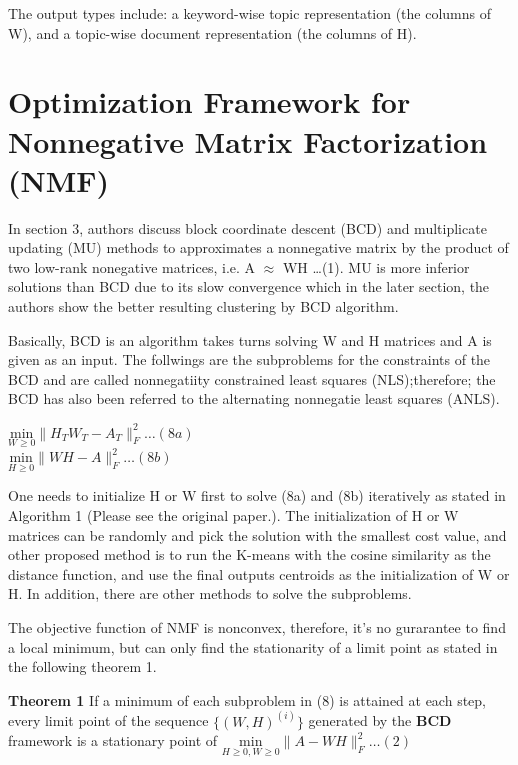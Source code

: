 \documentclass[11pt, oneside]{article}   	%
\begin{document}
The output types include: a keyword-wise topic representation (the columns of W), and a topic-wise document representation (the columns of H). 

\section{Optimization Framework for Nonnegative Matrix Factorization (NMF)}
In section 3, authors discuss block coordinate descent (BCD) and multiplicate updating (MU) methods to approximates a nonnegative matrix by the product of two low-rank nonegative matrices, i.e. A $\approx$ WH \ldots  (1).  MU is more inferior solutions than BCD due to its slow convergence which in the later section, the authors show the better resulting clustering by BCD algorithm.  

Basically, BCD is an algorithm takes turns solving W and H matrices and A is given as an input.  The follwings are the subproblems for the constraints of the BCD and are called nonnegatiity constrained least squares (NLS);therefore; the BCD has also been referred to the alternating nonnegatie least squares (ANLS).
\begin{center}
$\underset{W\geq0}{\mathrm{min}}\|H_{T}W_{T}-A_{T} \|^{\mathrm{2}}_{F} \ldots (8a)$\\
$\underset{H\geq0}{\mathrm{min}}\|WH-A\|^{\mathrm{2}}_{F}  \ldots (8b)$
\end{center}

One needs to initialize H or W first to solve (8a) and (8b) iteratively as stated in Algorithm 1 (Please see the original paper.).  The initialization of H or W matrices can be randomly and pick the solution with the smallest cost value, and other proposed method is to run the K-means with the cosine similarity as the distance function, and use the final outputs centroids as the initialization of W or H.  In addition, there are other methods to solve the subproblems.

The objective function of NMF is nonconvex, therefore, it's no gurarantee to find a local minimum, but can only find the stationarity of a limit point as stated in the following theorem 1.  

\textbf{Theorem 1}  If a minimum of each subproblem in (8) is attained at each step, every limit point of the sequence $\{(W,H)^{(i)}\}$ generated by the \textbf{BCD} framework is a stationary point of $\underset{H\geq0, W\geq0}{\mathrm{min}}\|A-WH\|^{\mathrm{2}}_{F}  \ldots (2)$
\end{document}
